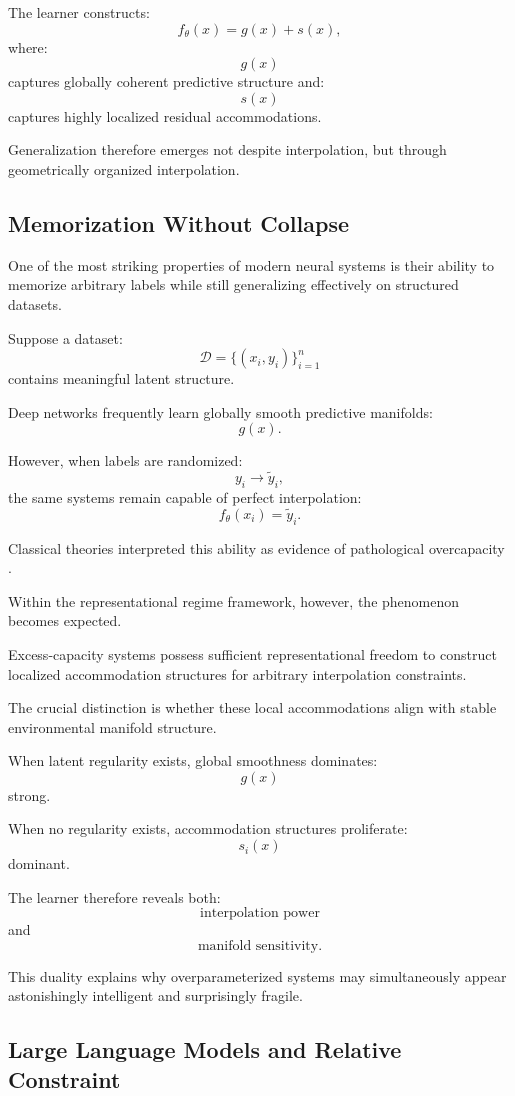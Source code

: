 \documentclass[12pt,a4paper]{article}
\begin{document}
The learner constructs:
\[
f_\theta(x)
=
g(x)
+
s(x),
\]
where:
\[
g(x)
\]
captures globally coherent predictive structure and:
\[
s(x)
\]
captures highly localized residual accommodations.

Generalization therefore emerges not despite interpolation, but through geometrically organized interpolation.

\subsection{Memorization Without Collapse}

One of the most striking properties of modern neural systems is their ability to memorize arbitrary labels while still generalizing effectively on structured datasets.

Suppose a dataset:
\[
\mathcal{D}
=
\{
(x_i,y_i)
\}_{i=1}^n
\]
contains meaningful latent structure.

Deep networks frequently learn globally smooth predictive manifolds:
\[
g(x).
\]

However, when labels are randomized:
\[
y_i
\rightarrow
\tilde{y}_i,
\]
the same systems remain capable of perfect interpolation:
\[
f_\theta(x_i)
=
\tilde{y}_i.
\]

Classical theories interpreted this ability as evidence of pathological overcapacity \cite{Zhang2017}.

Within the representational regime framework, however, the phenomenon becomes expected.

Excess-capacity systems possess sufficient representational freedom to construct localized accommodation structures for arbitrary interpolation constraints.

The crucial distinction is whether these local accommodations align with stable environmental manifold structure.

When latent regularity exists, global smoothness dominates:
\[
g(x)
\]
strong.

When no regularity exists, accommodation structures proliferate:
\[
s_i(x)
\]
dominant.

The learner therefore reveals both:
\[
\text{interpolation power}
\]
and
\[
\text{manifold sensitivity}.
\]

This duality explains why overparameterized systems may simultaneously appear astonishingly intelligent and surprisingly fragile.

\subsection{Large Language Models and Relative Constraint}
\end{document}
